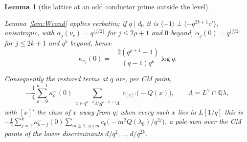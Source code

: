 \documentclass[11pt,reqno]{amsart}
\theoremstyle{plain}
\newtheorem{lemma}[theorem]{Lemma}
\theoremstyle{definition}
\newcommand{\Q}{\mathbb{Q}}
\newcommand{\Ldual}{L^{\vee}}
\begin{document}
\begin{lemma}[the lattice at an odd conductor prime outside the level]
\begin{enumerate}
      Lemma~\ref{lem:Wcond} applies verbatim; if $q\mid d_0$ it is $\langle-1\rangle\perp\langle
      -q^{2k+1}c'\rangle$, anisotropic, with $\alpha_j(\nu_r)=q^{\lfloor j/2\rfloor}$ for
      $j\le2\rho+1$ and $0$ beyond, $\alpha_j(0)=q^{\lfloor j/2\rfloor}$ for $j\le2k+1$ and $q^k$
      beyond, hence
      \[
        \kappa^-_{\nu_r}(0)=-\frac{2(q^{\rho+1}-1)}{(q-1)q^k}\log q .
      \]
\end{enumerate}
Consequently the restored terms at $q$ are, per CM point,
\[
  -\frac14\sum_{\rho=0}^{k-1}\kappa^-_\rho(0)\sum_{\substack{x\in q^{\rho-k}\Lambda\setminus q^{\rho-k+1}\Lambda}}
   c_{[x]'}\bigl(-Q(x)\bigr),\qquad \Lambda=\Ldual\cap\Q\lambda,
\]
with $[x]'$ the class of $x$ away from $q$; when every such $x$ lies in $L[1/q]$ this is
$-\tfrac12\sum_{j=1}^{k}\kappa^-_{k-j}(0)\sum_{m\ge1,\ q\nmid m}c_0\bigl(-m^2Q(\lambda_0)/q^{2j}\bigr)$,
a pole sum over the CM points of the lower discriminants $d/q^2,\dots,d/q^{2k}$.
\end{lemma}
\end{document}
